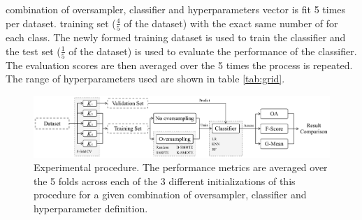 \documentclass[remotesensing,article,submit,moreauthors,pdftex]{Definitions/mdpi}
\begin{document}
\begin{paracol}{2}
 combination
of oversampler, classifier and hyperparameters vector is fit 5 times
 per dataset.  training set
($\frac{4}{5}$ of the dataset)   with the exact same number of  for
each class. The newly formed training dataset is used to train the classifier
and the test set ($\frac{1}{5}$ of the dataset)
is used to evaluate the performance of the classifier.  The evaluation scores
are then averaged over the 5 times the process is repeated. The range of
hyperparameters used are shown in table \ref{tab:grid}.

\end{paracol}
\begin{figure}
	\centering
    \captionsetup{justification=centering}
    \caption{Experimental procedure. The performance metrics are averaged over
    the 5 folds across each of the 3 different initializations of this
    procedure for a given combination of oversampler, classifier and
    hyperparameter definition.
    \vspace{.25cm}}\label{fig:experiment_pipeline}
	\includegraphics[width=1\linewidth]{../analysis/experiment_pipeline}
\end{figure}
\begin{paracol}{2}
\linenumbers
\switchcolumn

\end{paracol}
\end{document}
